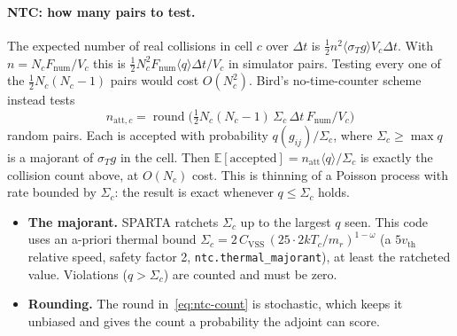 \documentclass[11pt,a4paper]{article}
\numberwithin{equation}{section}
\newcommand{\E}{\mathbb{E}}
\newcommand{\code}[1]{\texttt{#1}}
\begin{document}
\paragraph{NTC: how many pairs to test.}
The expected number of real collisions in cell $c$ over $\Delta t$ is
$\tfrac12 n^2\langle\sigma_T g\rangle V_c\Delta t$.  With $n = N_c F_{\mathrm{num}}/V_c$
this is $\tfrac12 N_c^2 F_{\mathrm{num}}\langle q\rangle\Delta t/V_c$ in simulator
pairs.  Testing every one of the $\tfrac12 N_c(N_c-1)$ pairs would cost $O(N_c^2)$.
Bird's no-time-counter scheme instead tests
\begin{equation}
\label{eq:ntc-count}
n_{\mathrm{att},c} = \operatorname{round}\Big(\tfrac12 N_c(N_c-1)\,
\Sigma_c\,\Delta t\,F_{\mathrm{num}}/V_c\Big)
\end{equation}
random pairs.  Each is accepted with probability $q(g_{ij})/\Sigma_c$, where
$\Sigma_c\ge\max q$ is a majorant of $\sigma_T g$ in the cell.  Then
$\E[\text{accepted}] = n_{\mathrm{att}}\langle q\rangle/\Sigma_c$ is exactly the
collision count above, at $O(N_c)$ cost.  This is thinning of a Poisson process
with rate bounded by $\Sigma_c$: the result is exact whenever $q\le\Sigma_c$ holds.
\begin{itemize}
\item \textbf{The majorant.}  SPARTA ratchets $\Sigma_c$ up to the largest $q$ seen.
  This code uses an a-priori thermal bound
  $\Sigma_c = 2\,C_{\mathrm{VSS}}\,(25\cdot 2kT_c/m_r)^{1-\omega}$ (a $5v_{\mathrm{th}}$
  relative speed, safety factor 2, \code{ntc.thermal\_majorant}), at least the
  ratcheted value.  Violations ($q > \Sigma_c$) are counted and must be zero.
\item \textbf{Rounding.}  The round in~\eqref{eq:ntc-count} is stochastic, which keeps
  it unbiased and gives the count a probability the adjoint can score.
\end{itemize}
\end{document}
